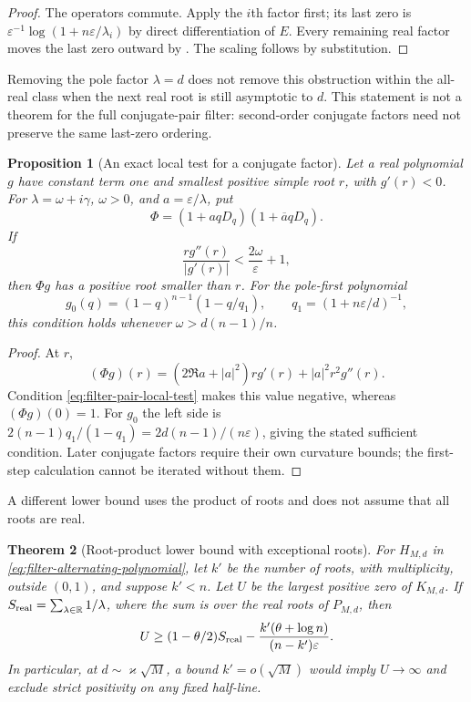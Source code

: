 \documentclass[11pt]{article}
\newtheorem{theorem}{Theorem}[section]
\newtheorem{proposition}[theorem]{Proposition}
\theoremstyle{definition}
\theoremstyle{remark}
\newcommand{\R}{\mathbb R}
\begin{document}
\begin{proof}
The operators commute.  Apply the $i$th factor first; its last zero is
$\varepsilon^{-1}\log(1+n\varepsilon/\lambda_i)$ by direct
differentiation of $E$.  Every remaining real factor moves the last
zero outward by .  The scaling follows
by substitution.
\end{proof}

Removing the pole factor $\lambda=d$ does not remove this obstruction
within the all-real class when the next real root is still asymptotic
to $d$.  This statement is not a theorem for the full conjugate-pair
filter: second-order conjugate factors need not preserve the same
last-zero ordering.

\begin{proposition}[An exact local test for a conjugate factor]
\label{prop:filter-first-pair}
Let a real polynomial $g$ have constant term one and smallest positive
simple root $r$, with $g'(r)<0$.  For $\lambda=\omega+i\gamma$,
$\omega>0$, and $a=\varepsilon/\lambda$, put
\[
 \Phi=(1+a qD_q)(1+\overline a qD_q).
\]
If
\begin{equation}
 \frac{r g''(r)}{|g'(r)|}<\frac{2\omega}{\varepsilon}+1,
 \label{eq:filter-pair-local-test}
\end{equation}
then $\Phi g$ has a positive root smaller than $r$.
For the pole-first polynomial
\[
 g_0(q)=(1-q)^{n-1}(1-q/q_1),\qquad
 q_1=(1+n\varepsilon/d)^{-1},
\]
this condition holds whenever $\omega>d(n-1)/n$.
\end{proposition}

\begin{proof}
At $r$,
\[
 (\Phi g)(r)=(2\Re a+|a|^2)r g'(r)+|a|^2r^2g''(r).
\]
Condition \eqref{eq:filter-pair-local-test} makes this value negative,
whereas $(\Phi g)(0)=1$.  For $g_0$ the left side is
$2(n-1)q_1/(1-q_1)=2d(n-1)/(n\varepsilon)$, giving the stated
sufficient condition.  Later conjugate factors require their own
curvature bounds; the first-step calculation cannot be iterated
without them.
\end{proof}

A different lower bound uses the product of roots and does not assume
that all roots are real.

\begin{theorem}[Root-product lower bound with exceptional roots]
\label{thm:filter-root-product}
For $H_{M,d}$ in \eqref{eq:filter-alternating-polynomial}, let $k'$ be
the number of roots, with multiplicity, outside $(0,1)$, and suppose
$k'<n$.  Let $U$ be the largest positive zero of $K_{M,d}$.  If
$S_{\rm real}=\sum_{\lambda\in\R}1/\lambda$, where the sum is over
the real roots of $P_{M,d}$, then
\begin{equation}
 U\ge(1-\theta/2)S_{\rm real}
       -\frac{k'(\theta+\log n)}{(n-k')\varepsilon}.
 \label{eq:filter-root-product-bound}
\end{equation}
In particular, at $d\sim\varkappa\sqrt M$, a bound
$k'=o(\sqrt M)$ would imply $U\to\infty$ and exclude strict
positivity on any fixed half-line.
\end{theorem}
\end{document}

